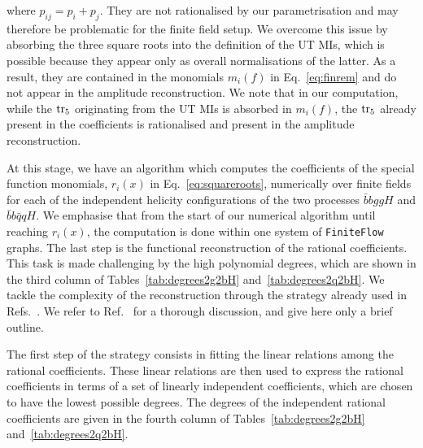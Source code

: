 \documentclass[main.tex]{subfiles}
\begin{document}
where $p_{ij} = p_i + p_j$.
They are not rationalised by our parametrisation and may therefore be problematic for the finite field setup. We overcome this issue by absorbing the three square roots into the definition of the UT MIs, which is possible because they appear only as overall normalisations of the latter. As a result, they are contained in the monomials $m_i(f)$ in Eq.~\ref{eq:finrem} and do not appear in the amplitude reconstruction.
We note that in our computation, while the $\operatorname{\rm tr}_5$ originating from the UT MIs is absorbed in $m_i(f)$, 
the $\operatorname{\rm tr}_5$ already present in the coefficients is rationalised and present in the amplitude reconstruction.

At this stage, we have an algorithm which computes the coefficients of the special function monomials, $r_i(x)$ in Eq.~\ref{eq:squareroots}, 
numerically over finite fields for each of the independent helicity configurations of the two processes $\bar{b}bggH$ and $\bar{b}b\bar{q}qH$. 
We emphasise that from the start of our numerical algorithm until reaching $r_i(x)$, the computation is done within one system of \texttt{FiniteFlow} graphs.
The last step is the functional reconstruction of the rational coefficients. This task is made challenging by the high polynomial degrees, which are shown in the third column of Tables~\ref{tab:degrees2g2bH} and~\ref{tab:degrees2q2bH}. We tackle the complexity of the reconstruction through the strategy already used in Refs.~\cite{Badger:2021nhg,Badger:2021imn}. We refer to Ref.~\cite{Badger:2021imn} for a thorough discussion, and give here only a brief outline. 

The first step of the strategy consists in fitting the linear relations among the rational coefficients. These linear relations are then used to express the rational coefficients in terms of a set of linearly independent coefficients, which are chosen to have the lowest possible degrees. The degrees of the independent rational coefficients are given in the fourth column of Tables~\ref{tab:degrees2g2bH} and~\ref{tab:degrees2q2bH}.
\end{document}
